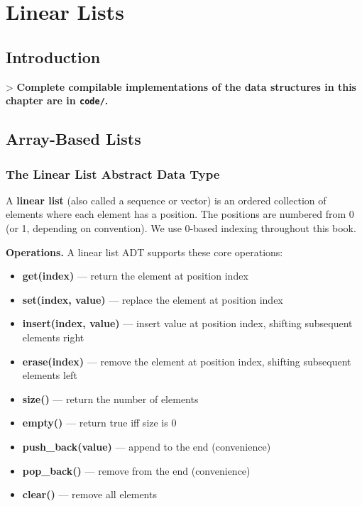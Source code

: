 \chapter{Linear Lists}\label{ch04:linear-lists}

\section{Introduction}

> \textbf{Complete compilable implementations of the data structures in this chapter are in \texttt{code/}.}

\section{Array-Based Lists}

\subsection{The Linear List Abstract Data Type}

A \textbf{linear list} (also called a sequence or vector) is an ordered collection of elements where each element has a position. The positions are numbered from 0 (or 1, depending on convention). We use 0-based indexing throughout this book.

\textbf{Operations.} A linear list ADT supports these core operations:

\begin{itemize}
\item \textbf{get(index)} — return the element at position index
\item \textbf{set(index, value)} — replace the element at position index
\item \textbf{insert(index, value)} — insert value at position index, shifting subsequent elements right
\item \textbf{erase(index)} — remove the element at position index, shifting subsequent elements left
\item \textbf{size()} — return the number of elements
\item \textbf{empty()} — return true iff size is 0
\item \textbf{push\_back(value)} — append to the end (convenience)
\item \textbf{pop\_back()} — remove from the end (convenience)
\item \textbf{clear()} — remove all elements
\end{itemize}

